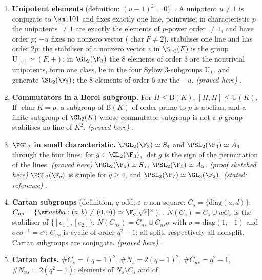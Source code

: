 \begin{enumerate}[label=\textbf{\thechapter.\arabic*}]
diagonal group). . $\mathrm B=\mathrm U\rtimes\mathrm T$, $\#\mathrm B(\F_q)=q(q-1)^2$, Borel subgroups are conjugate and self-normalising,
and a subgroup stabilises a line iff it lies in a Borel subgroup; $\mathrm B(\F_3)\simeq C_2\times S_3\simeq D_6$. \emph{(proved here)}
.
\item \textbf{Unipotent elements} (definition: $(u-1)^2=0$). . A unipotent $u\ne1$ is conjugate to $\sm1101$ and
fixes exactly one line, pointwise; in characteristic $p$ the unipotents $\ne1$ are exactly the elements of $p$-power order $\ne1$,
and have order $p$; $-u$ fixes no nonzero vector ($\operatorname{char}F\ne2$), stabilises one line and has order $2p$; the stabiliser of a
nonzero vector $v$ in $\SL_2(F)$ is the group $\mathrm U_{[v]}\simeq(F,+)$; in $\GL_2(\F_3)$ the $8$ elements of order $3$ are the
nontrivial unipotents, form one class, lie in the four Sylow $3$-subgroups $\mathrm U_L$, and generate $\SL_2(\F_3)$; the $8$
elements of order $6$ are the $-u$. \emph{(proved here)} .
\item \textbf{Commutators in a Borel subgroup.} For $H\le\mathrm B(K)$, $[H,H]\le\mathrm U(K)$. If $\operatorname{char}K=p$: a subgroup of $\mathrm B(K)$ of order prime to $p$
is abelian, and a finite subgroup of $\GL_2(K)$ whose commutator subgroup is not a $p$-group stabilises no line of $K^2$.
\emph{(proved here)} .
\item \textbf{$\PGL_2$ in small characteristic.} $\PGL_2(\F_3)\simeq S_4$ and $\PSL_2(\F_3)\simeq A_4$ through the four lines; for $g\in\GL_2(\F_3)$,
$\det g$ is the sign of the permutation of the lines. \emph{(proved here)} $\PGL_2(\F_5)\simeq S_5$, $\PSL_2(\F_5)\simeq A_5$. \emph{(proof
sketched here)} $\PSL_2(\F_q)$ is simple for $q\ge4$, and $\PSL_2(\F_7)\simeq\GL_3(\F_2)$. \emph{(stated; reference)}
.
\item \textbf{Cartan subgroups} (definition, $q$ odd, $\varepsilon$ a non-square: $C_s=\{\mathrm{diag}(a,d)\}$; $C_{ns}=\{\sm a{\varepsilon b}ba:(a,b)\ne(0,0)\}\simeq\F_q[\sqrt\varepsilon]^\times$).
. $N(C_s)=C_s\cup wC_s$ is the stabiliser of $\{[e_1],[e_2]\}$; $N(C_{ns})=C_{ns}\cup C_{ns}\sigma$ with $\sigma=\mathrm{diag}(1,-1)$ and
$\sigma c\sigma^{-1}=c^q$; $C_{ns}$ is cyclic of order $q^2-1$; all split, respectively all nonsplit, Cartan subgroups are conjugate.
\emph{(proved here)} .
\item \textbf{Cartan facts.} $\#C_s=(q-1)^2$, $\#N_s=2(q-1)^2$, $\#C_{ns}=q^2-1$, $\#N_{ns}=2(q^2-1)$; elements of $N_s\setminus C_s$ and of

\end{enumerate}
